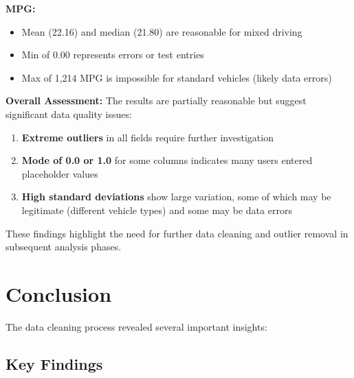 \documentclass{article}
\begin{document}
\textbf{MPG:}
\begin{itemize}
    \item Mean (22.16) and median (21.80) are reasonable for mixed driving
    \item Min of 0.00 represents errors or test entries
    \item Max of 1,214 MPG is impossible for standard vehicles (likely data errors)
\end{itemize}

\textbf{Overall Assessment:}
The results are partially reasonable but suggest significant data quality issues:
\begin{enumerate}
    \item \textbf{Extreme outliers} in all fields require further investigation
    \item \textbf{Mode of 0.0 or 1.0} for some columns indicates many users entered placeholder values
    \item \textbf{High standard deviations} show large variation, some of which may be legitimate (different vehicle types) and some may be data errors
\end{enumerate}

These findings highlight the need for further data cleaning and outlier removal in subsequent analysis phases.

\section{Conclusion}

The data cleaning process revealed several important insights:

\subsection{Key Findings}
\end{document}
